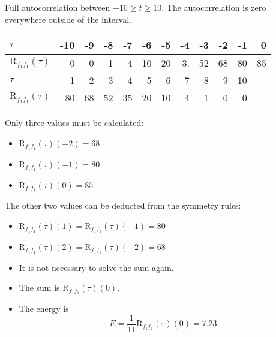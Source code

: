 \begin{solution}
\begin{tasks}
		\task
		Full autocorrelation between $-10 \geq t \geq 10$. The autocorrelation is zero everywhere outside of the interval.
		\begin{table}[H]
			\centering
			\begin{tabular}{|l|r|r|r|r|r|r|r|r|r|r|r|}
				\hline
				$\tau$ & -10 & -9 & -8 & -7 & -6 & -5 & -4 & -3 & -2 & -1 & 0 \\
				\hline
				$\mathrm{R}_{f_1 f_1}(\tau)$ & 0 &  0 &  1 &  4 & 10 & 20 & 3. & 52 & 68 & 80 & 85 \\
				\hline
				\hline
				$\tau$ & 1 & 2 & 3 & 4 & 5 & 6 & 7 & 8 & 9 & 10 & \\
				\hline
				$\mathrm{R}_{f_1 f_1}(\tau)$ & 80 & 68 & 52 & 35 & 20 & 10 &  4 &  1 &  0 &  0 & \\
				\hline
			\end{tabular}
		\end{table}
		Only three values must be calculated:
		\begin{itemize}
			\item $\mathrm{R}_{f_1 f_1}(\tau)(-2) = 68$
			\item $\mathrm{R}_{f_1 f_1}(\tau)(-1) = 80$
			\item $\mathrm{R}_{f_1 f_1}(\tau)(0) = 85$
		\end{itemize}
		The other two values can be deducted from the symmetry rules:
		\begin{itemize}
			\item $\mathrm{R}_{f_1 f_1}(\tau)(1) = \mathrm{R}_{f_1 f_1}(\tau)(-1) = 80$
			\item $\mathrm{R}_{f_1 f_1}(\tau)(2) = \mathrm{R}_{f_1 f_1}(\tau)(-2) = 68$
		\end{itemize}
	
		\task
		\begin{itemize}
			\item It is not necessary to solve the sum again.
			\item The sum is $\mathrm{R}_{f_1 f_1}(\tau)(0)$.
			\item The energy is
			\begin{equation*}
				E = \frac{1}{11} \mathrm{R}_{f_1 f_1}(\tau)(0) = 7.23
			\end{equation*}
		\end{itemize}
	\end{tasks}
\end{solution}


